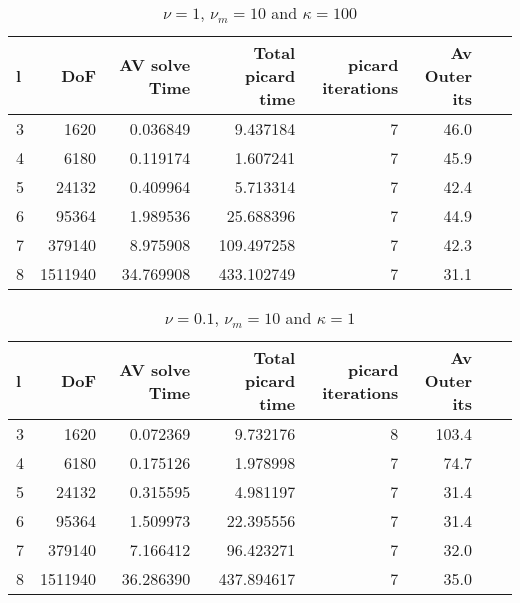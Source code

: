 \documentclass{article}
\begin{document}
\begin{table}
\begin{tabular}{lrrrrrll}
\hline
l &      DoF &  AV solve Time &  Total picard time &  picard iterations & Av Outer its \\
\hline
3 &     1620 &       0.036849 &           9.437184 &                  7 &         46.0 \\
4 &     6180 &       0.119174 &           1.607241 &                  7 &         45.9 \\
5 &    24132 &       0.409964 &           5.713314 &                  7 &         42.4 \\
6 &    95364 &       1.989536 &          25.688396 &                  7 &         44.9 \\
7 &   379140 &       8.975908 &         109.497258 &                  7 &         42.3 \\
8 &  1511940 &      34.769908 &         433.102749 &                  7 &         31.1 \\
\hline
\end{tabular}
\caption{$\nu=1$, $\nu_m = 10$ and $\kappa = 100$}
\end{table}

\begin{table}
\begin{tabular}{lrrrrrll}
\hline
l &      DoF &  AV solve Time &  Total picard time &  picard iterations & Av Outer its \\
\hline
3 &     1620 &       0.072369 &           9.732176 &                  8 &        103.4 \\
4 &     6180 &       0.175126 &           1.978998 &                  7 &         74.7 \\
5 &    24132 &       0.315595 &           4.981197 &                  7 &         31.4 \\
6 &    95364 &       1.509973 &          22.395556 &                  7 &         31.4 \\
7 &   379140 &       7.166412 &          96.423271 &                  7 &         32.0 \\
8 &  1511940 &      36.286390 &         437.894617 &                  7 &         35.0 \\
\hline
\end{tabular}
\caption{$\nu=0.1$, $\nu_m = 10$ and $\kappa = 1$}
\end{table}
\end{document}
